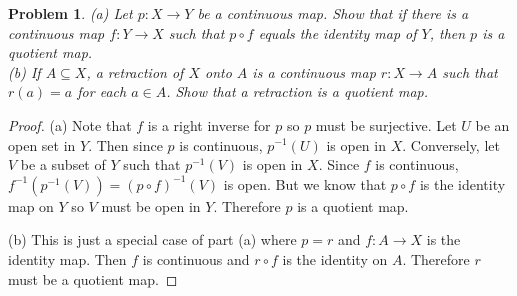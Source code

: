 \documentclass{article}
\newtheorem{problem}{Problem}
\begin{document}
\begin{problem}
(a) Let $p : X \to Y$ be a continuous map. Show that if there is a continuous map $f : Y \to X$ such that $p \circ f$ equals the identity map of $Y$, then $p$ is a quotient map.\\
(b) If $A \subseteq X$, a \emph{retraction} of $X$ onto $A$ is a continuous map $r : X \to A$ such that $r(a) = a$ for each $a \in A$. Show that a retraction is a quotient map.
\end{problem}
\begin{proof}
(a) Note that $f$ is a right inverse for $p$ so $p$ must be surjective. Let $U$ be an open set in $Y$. Then since $p$ is continuous, $p^{-1}(U)$ is open in $X$. Conversely, let $V$ be a subset of $Y$ such that $p^{-1}(V)$ is open in $X$. Since $f$ is continuous, $f^{-1}(p^{-1}(V)) = (p \circ f)^{-1}(V)$ is open. But we know that $p \circ f$ is the identity map on $Y$ so $V$ must be open in $Y$. Therefore $p$ is a quotient map.

(b) This is just a special case of part (a) where $p = r$ and $f : A \to X$ is the identity map. Then $f$ is continuous and $r \circ f$ is the identity on $A$. Therefore $r$ must be a quotient map.
\end{proof}
\end{document}
